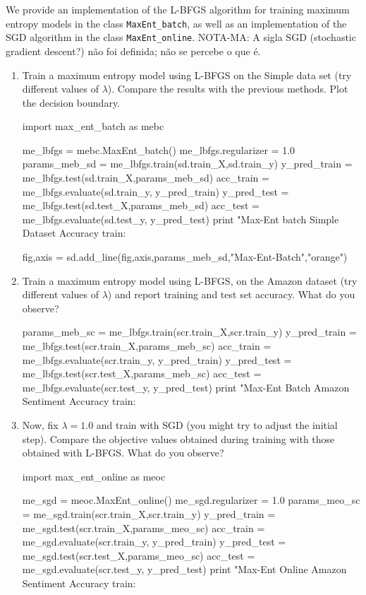 \begin{exercise}
We provide an implementation of the L-BFGS algorithm for training maximum entropy models in the class {\tt MaxEnt\_batch}, 
as well as an implementation of the SGD algorithm in the class {\tt MaxEnt\_online}. 
NOTA-MA: A sigla SGD (stochastic gradient descent?) não foi definida; não se percebe o que é.
\begin{enumerate}
\item Train a  maximum entropy model using L-BFGS on the Simple data
  set (try different values of $\lambda$). Compare the results with the previous methods. Plot the decision boundary. 
\begin{python}
import max_ent_batch as mebc

me_lbfgs = mebc.MaxEnt_batch()
me_lbfgs.regularizer = 1.0
params_meb_sd = me_lbfgs.train(sd.train_X,sd.train_y)
y_pred_train = me_lbfgs.test(sd.train_X,params_meb_sd)
acc_train = me_lbfgs.evaluate(sd.train_y, y_pred_train)
y_pred_test = me_lbfgs.test(sd.test_X,params_meb_sd)
acc_test = me_lbfgs.evaluate(sd.test_y, y_pred_test)
print "Max-Ent batch Simple Dataset Accuracy train: %

fig,axis = sd.add_line(fig,axis,params_meb_sd,"Max-Ent-Batch","orange")
\end{python}

\item Train a maximum entropy model using L-BFGS, on the Amazon
  dataset (try different values of $\lambda$) and report training and test set accuracy. What do you observe? 
\begin{python}
params_meb_sc = me_lbfgs.train(scr.train_X,scr.train_y)
y_pred_train = me_lbfgs.test(scr.train_X,params_meb_sc)
acc_train = me_lbfgs.evaluate(scr.train_y, y_pred_train)
y_pred_test = me_lbfgs.test(scr.test_X,params_meb_sc)
acc_test = me_lbfgs.evaluate(scr.test_y, y_pred_test)
print "Max-Ent Batch Amazon Sentiment Accuracy train: %
\end{python}

\item Now, fix $\lambda = 1.0$ and train with SGD (you might try to adjust the initial step). 
Compare the objective values obtained during training with those obtained with L-BFGS. What do you observe? 
\begin{python}
import max_ent_online as meoc

me_sgd = meoc.MaxEnt_online()
me_sgd.regularizer = 1.0
params_meo_sc = me_sgd.train(scr.train_X,scr.train_y)
y_pred_train = me_sgd.test(scr.train_X,params_meo_sc)
acc_train = me_sgd.evaluate(scr.train_y, y_pred_train)
y_pred_test = me_sgd.test(scr.test_X,params_meo_sc)
acc_test = me_sgd.evaluate(scr.test_y, y_pred_test)
print "Max-Ent Online Amazon Sentiment Accuracy train: %
\end{python}
\end{enumerate}
\end{exercise}


